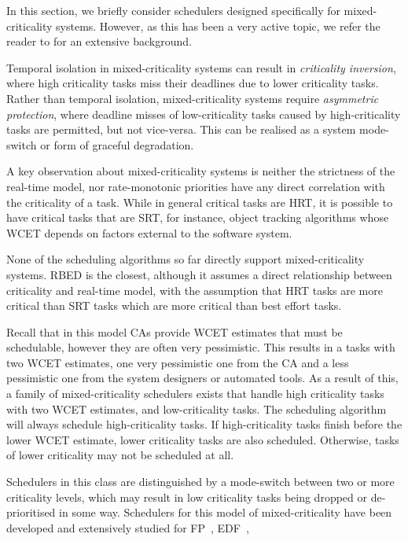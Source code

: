 In this section, we briefly consider schedulers designed specifically for mixed-criticality systems. 
However, as this has been a very active topic, we refer the reader to \citet{Burns_Davis_17} for
an extensive background. 

Temporal isolation in mixed-criticality systems can result in \emph{criticality inversion}, where
high criticality tasks miss their deadlines due to lower criticality tasks.  Rather than temporal
isolation, mixed-criticality systems require \emph{asymmetric protection}, where deadline misses of
low-criticality tasks caused by high-criticality tasks are permitted, but not vice-versa.  This can
be realised as a system mode-switch or form of graceful degradation.

A key observation about mixed-criticality systems is neither the strictness of the real-time model,
nor rate-monotonic priorities have any direct correlation with the criticality of a task.  While in
general critical tasks are \gls{HRT}, it is possible to have critical tasks that are \gls{SRT}, for
instance, object tracking algorithms whose \gls{WCET} depends on factors external to the software
system.

None of the scheduling algorithms so far directly support mixed-criticality systems.  \gls{RBED} is
the closest, although it assumes a direct relationship between criticality and real-time model, with
the assumption that \gls{HRT} tasks are more critical than \gls{SRT} tasks which are more critical
than best effort tasks. 

Recall that in this model \glspl{CA} provide \gls{WCET} estimates that must be schedulable, however they are often very
pessimistic.  This results in a tasks with two {\gls{WCET}} estimates, one very pessimistic one from
the \gls{CA} and a less pessimistic one from the system designers or automated tools.  As a result
of this, a family of mixed-criticality schedulers exists that handle high criticality tasks with two
{\gls{WCET}} estimates, and low-criticality tasks.  The scheduling algorithm will always schedule
high-criticality tasks.  If high-criticality tasks finish before the lower \gls{WCET} estimate,
lower criticality tasks are also scheduled.  Otherwise, tasks of lower criticality may not be
scheduled at all. 

Schedulers in this class are distinguished by a mode-switch between two or more criticality levels,
which may result in low criticality tasks being dropped or de-prioritised in some way. 
Schedulers for this model of mixed-criticality have been developed and extensively studied for
\gls{FP}~\citet{Vestal_07, Pathan:phd}, \gls{EDF}~\citet{Baruah_BDMVS_11},

